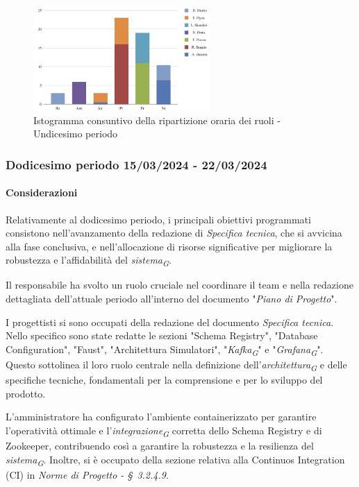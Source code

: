 \begin{figure}[H]
    \centering
    \includegraphics[width=0.6\textwidth]{../Images/graficoConsPrev11.png}
    \caption{Istogramma consuntivo della ripartizione oraria dei ruoli - Undicesimo periodo}
    \label{fig:Consuntivo_ripartizione_oraria_11}
\end{figure}


\subsubsection{Dodicesimo periodo  15/03/2024 - 22/03/2024}

\paragraph{Considerazioni}
Relativamente al dodicesimo periodo, i principali obiettivi programmati consistono nell'avanzamento della redazione di \textit{Specifica tecnica}, che si avvicina alla fase conclusiva, e nell'allocazione di risorse significative per migliorare la robustezza e l'affidabilità del \textit{sistema}\textsubscript{\textit{G}}.

Il responsabile ha svolto un ruolo cruciale nel coordinare il team e nella redazione dettagliata dell'attuale periodo all'interno del documento "\textit{Piano di Progetto}".

I progettisti si sono occupati della redazione del documento \textit{Specifica tecnica}. Nello specifico sono state redatte le sezioni "Schema Registry", "Database Configuration", "Faust", "Architettura Simulatori", "\textit{Kafka}\textsubscript{\textit{G}}" e "\textit{Grafana}\textsubscript{\textit{G}}". Questo sottolinea il loro ruolo centrale nella definizione dell'\textit{architettura}\textsubscript{\textit{G}} e delle specifiche tecniche, fondamentali per la comprensione e per lo sviluppo del prodotto.

L'amministratore ha configurato l'ambiente containerizzato per garantire l'operatività ottimale e l'\textit{integrazione}\textsubscript{\textit{G}} corretta dello Schema Registry e di Zookeeper, contribuendo così a garantire la robustezza e la resilienza del \textit{sistema}\textsubscript{\textit{G}}. Inoltre, si è occupato della sezione relativa alla Continuos Integration (CI) in \textit{Norme di Progetto - \S~3.2.4.9}.

